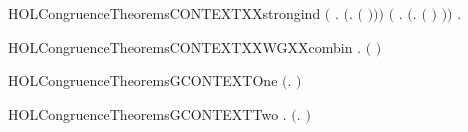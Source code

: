 \begin{SaveVerbatim}{HOLCongruenceTheoremsCONTEXTXXstrongind}
       \ensuremath{(}\HOLSymConst{\HOLTokenForall{}} .   \HOLSymConst{\HOLTokenConj{}}   \HOLSymConst{\HOLTokenImp{}}  \ensuremath{(}\HOLTokenLambda{}.   \ensuremath{(} \ensuremath{)}\ensuremath{)}\ensuremath{)} \HOLSymConst{\HOLTokenConj{}}
       \ensuremath{(}\HOLSymConst{\HOLTokenForall{}} .
              \HOLSymConst{\HOLTokenConj{}}   \HOLSymConst{\HOLTokenImp{}}
             \ensuremath{(}\HOLTokenLambda{}.  \ensuremath{(} \ensuremath{)} \ensuremath{)}\ensuremath{)} \HOLSymConst{\HOLTokenImp{}}
       \HOLSymConst{\HOLTokenForall{}}.   \HOLSymConst{\HOLTokenImp{}}  
\end{SaveVerbatim}
\newcommand{\HOLCongruenceTheoremsCONTEXTXXstrongind}{\UseVerbatim{HOLCongruenceTheoremsCONTEXTXXstrongind}}
\begin{SaveVerbatim}{HOLCongruenceTheoremsCONTEXTXXWGXXcombin}
\HOLTokenTurnstile{} \HOLSymConst{\HOLTokenForall{}} .   \HOLSymConst{\HOLTokenConj{}}   \HOLSymConst{\HOLTokenImp{}}  \ensuremath{(} \HOLConst{\HOLTokenCompose} \ensuremath{)}
\end{SaveVerbatim}
\newcommand{\HOLCongruenceTheoremsCONTEXTXXWGXXcombin}{\UseVerbatim{HOLCongruenceTheoremsCONTEXTXXWGXXcombin}}
\begin{SaveVerbatim}{HOLCongruenceTheoremsGCONTEXTOne}
\HOLTokenTurnstile{}  \ensuremath{(}\HOLTokenLambda{}. \ensuremath{)}
\end{SaveVerbatim}
\newcommand{\HOLCongruenceTheoremsGCONTEXTOne}{\UseVerbatim{HOLCongruenceTheoremsGCONTEXTOne}}
\begin{SaveVerbatim}{HOLCongruenceTheoremsGCONTEXTTwo}
\HOLTokenTurnstile{} \HOLSymConst{\HOLTokenForall{}}.  \ensuremath{(}\HOLTokenLambda{}. \ensuremath{)}
\end{SaveVerbatim}
\newcommand{\HOLCongruenceTheoremsGCONTEXTTwo}{\UseVerbatim{HOLCongruenceTheoremsGCONTEXTTwo}}
